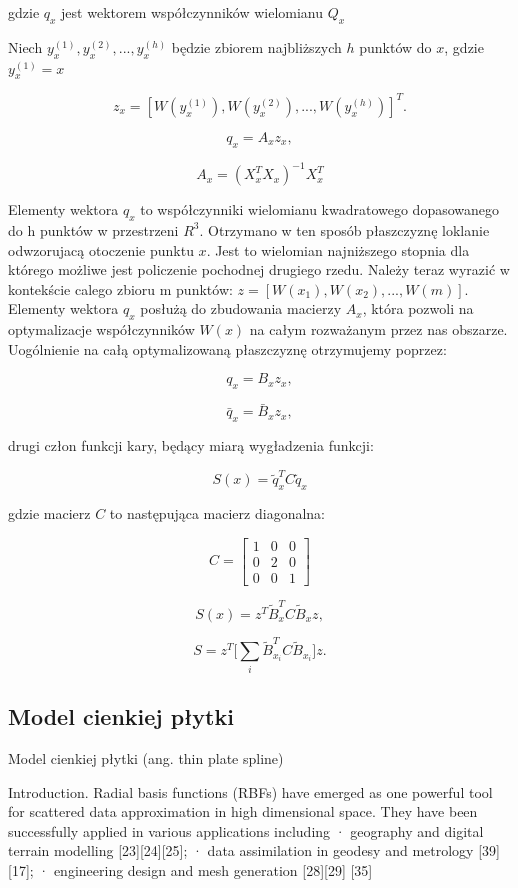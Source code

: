 \documentclass[polish, twoside, 12pt, a4paper]{article}
\theoremstyle{definition}
\theoremstyle{plain}
\theoremstyle{remark}
\begin{document}
gdzie \(q_x\) jest wektorem współczynników wielomianu \(Q_x\)


Niech \(y_x^{(1)}, y_x^{(2)}, ... , y_x^{(h)}\) będzie zbiorem najbliższych $h$ punktów do \(x\), gdzie \(y_x^{(1)} = x\)    


\[
z_x=[W(y_x^{(1)}), W(y_x^{(2)}), ...   , W(y_x^{(h)})]^T .
\]



\[
q_x= A_x z_x,
\]


\[
A_x = (X_x^TX_x)^{-1}X_x^T
\]

Elementy wektora  \(q_x\) to współczynniki wielomianu kwadratowego dopasowanego do h punktów w przestrzeni \(R^3\). Otrzymano w ten sposób płaszczyznę loklanie odwzorujacą otoczenie punktu \(x\). Jest to wielomian najniższego stopnia dla którego możliwe jest policzenie pochodnej drugiego rzedu. Należy teraz wyrazić w kontekście calego zbioru m punktów: \(z=[W(x_1), W(x_2), ...   , W(m)]\). Elementy wektora  \(q_x\) posłużą do zbudowania macierzy \(A_x\), która pozwoli na optymalizacje współczynników \(W(x)\) na całym rozważanym przez nas obszarze. Uogólnienie na całą optymalizowaną płaszczyznę otrzymujemy poprzez:  

\[
 q_x=B_x z_x,
\]



\[
 \bar{q}_x=\bar{B}_x z_x,
\]

drugi człon funkcji kary, będący miarą wygładzenia funkcji:

\[
 S(x)=\tilde{q}_x^T C \tilde{q}_x
\]

gdzie macierz \(C\) to następująca macierz diagonalna:

\[
C=
\begin{bmatrix}
1                & 0 & 0       \\
0                & 2 & 0  \\
0		& 0 & 1
\end{bmatrix}
\]


\[
 S(x)=z^T \tilde{B}_x^TC\tilde{B}_xz,
\]

\[
S=z^T [\sum\limits_{i}{\tilde{B}_{x_{i}}^TC\tilde{B}_{x_{i}}]}z.
\]

\clearpage
\subsection{Model cienkiej płytki}

Model cienkiej płytki (ang. thin plate spline) 



 Introduction. Radial basis functions (RBFs) have emerged as one powerful
tool for scattered data approximation in high dimensional space. They have been
successfully applied in various applications including
· geography and digital terrain modelling [23][24][25];
· data assimilation in geodesy and metrology [39][17];
· engineering design and mesh generation [28][29] [35]
\end{document}
